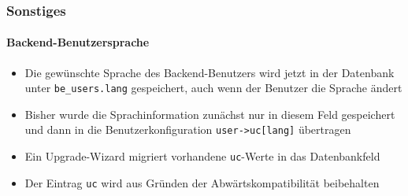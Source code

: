 %

\begin{frame}[fragile]
	\frametitle{Sonstiges}
	\framesubtitle{Backend-Benutzersprache}

	\begin{itemize}
		\item Die gewünschte Sprache des Backend-Benutzers wird jetzt in der
			Datenbank unter \texttt{be\_users.lang} gespeichert, auch wenn der 
			Benutzer die Sprache ändert
		\item Bisher wurde die Sprachinformation zunächst nur in diesem Feld gespeichert
			und dann in die Benutzerkonfiguration
			\texttt{user->uc[lang]} übertragen
		\item Ein Upgrade-Wizard migriert vorhandene \texttt{uc}-Werte in das
			Datenbankfeld
		\item Der Eintrag \texttt{uc} wird aus Gründen der Abwärtskompatibilität beibehalten
	\end{itemize}

\end{frame}

